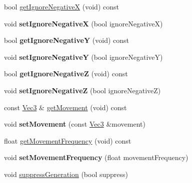 \begin{DoxyCompactItemize}
bool \hyperlink{classPUForceFieldAffector_a8ea01b32511213bfff8496bf05369dde}{get\+Ignore\+NegativeX} (void) const
\item 
\mbox{\label{classPUForceFieldAffector_a7ad3107c85af62b7ba78639359874ff6}} 
void {\bfseries set\+Ignore\+NegativeX} (bool ignore\+NegativeX)
\item 
\mbox{\label{classPUForceFieldAffector_ae045d201d2b2878a945208358916584a}} 
bool {\bfseries get\+Ignore\+NegativeY} (void) const
\item 
\mbox{\label{classPUForceFieldAffector_aab4a317d0ebf00d0a04011d61c15bc85}} 
void {\bfseries set\+Ignore\+NegativeY} (bool ignore\+NegativeY)
\item 
\mbox{\label{classPUForceFieldAffector_ae710c9e66ec8cf31be6849adc880a8de}} 
bool {\bfseries get\+Ignore\+NegativeZ} (void) const
\item 
\mbox{\label{classPUForceFieldAffector_a884af5ed35a5eba03693bfe320b241b4}} 
void {\bfseries set\+Ignore\+NegativeZ} (bool ignore\+NegativeZ)
\item 
const \hyperlink{classVec3}{Vec3} \& \hyperlink{classPUForceFieldAffector_afa86a49b2ae5aa552c41eea894a71b9a}{get\+Movement} (void) const
\item 
\mbox{\label{classPUForceFieldAffector_acebcf5e74b25d588e26ee94e3bc5c6ae}} 
void {\bfseries set\+Movement} (const \hyperlink{classVec3}{Vec3} \&movement)
\item 
float \hyperlink{classPUForceFieldAffector_a208862ee82ecc2a325246ec84047ce80}{get\+Movement\+Frequency} (void) const
\item 
\mbox{\label{classPUForceFieldAffector_a6e7290c6b426621729a5298c1b445dd4}} 
void {\bfseries set\+Movement\+Frequency} (float movement\+Frequency)
\item 
void \hyperlink{classPUForceFieldAffector_ab9dd939076aa4e946bc9e7a26248e360}{suppress\+Generation} (bool suppress)
\item 
\mbox{\label{classPUForceFieldAffector_ac6e3ef80377705211e26878b8f79a984}} 

\end{DoxyCompactItemize}
